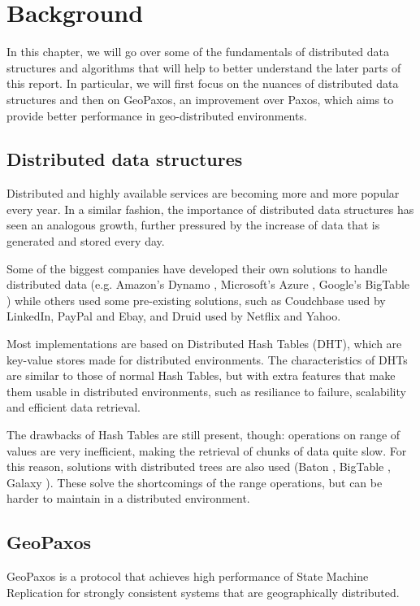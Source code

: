 \chapter{Background}\label{sec:Background}
In this chapter, we will go over some of the fundamentals of distributed data structures and algorithms that will help to better understand the later parts of this report. In particular, we will first focus on the nuances of distributed data structures and then on  GeoPaxos, an improvement over Paxos, which aims to provide better performance in geo-distributed environments.

\section{Distributed data structures}\label{sec:distributed-data-structures}
Distributed and highly available services are becoming more and more popular every year. In a similar fashion, the importance of distributed data structures has seen an analogous growth, further pressured by the increase of data that is generated and stored every day. 

Some of the biggest companies have developed their own solutions to handle distributed data (e.g. Amazon's Dynamo \citep{dynamo}, Microsoft's Azure \citep{azure}, Google's BigTable \citep{bigtable}) while others used some pre-existing solutions, such as Coudchbase \citep{couchbase} used by LinkedIn, PayPal and Ebay, and Druid \citep{druid} used by Netflix and Yahoo. 

Most implementations are based on Distributed Hash Tables (DHT), which are key-value stores made for distributed environments.
The characteristics of DHTs are similar to those of normal Hash Tables, but with extra features that make them usable in distributed environments, such as resiliance to failure, scalability and efficient data retrieval.

The drawbacks of Hash Tables are still present, though: operations on range of values are very inefficient, making the retrieval of chunks of data quite slow. For this reason, solutions with distributed trees are also used (Baton \citep{baton}, BigTable \citep{bigtable}, Galaxy \citep{galaxy}). These solve the shortcomings of the range operations, but can be harder to maintain in a distributed environment. 

\section{GeoPaxos}\label{sec:GeoPaxos}
GeoPaxos is a protocol that achieves high performance of State Machine Replication for strongly consistent systems that are geographically distributed.

